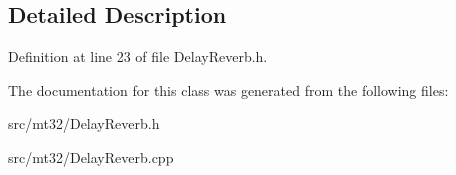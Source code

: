 \subsection{Detailed Description}


Definition at line 23 of file Delay\-Reverb.\-h.



The documentation for this class was generated from the following files\-:\begin{DoxyCompactItemize}
\item 
src/mt32/Delay\-Reverb.\-h\item 
src/mt32/Delay\-Reverb.\-cpp\end{DoxyCompactItemize}
